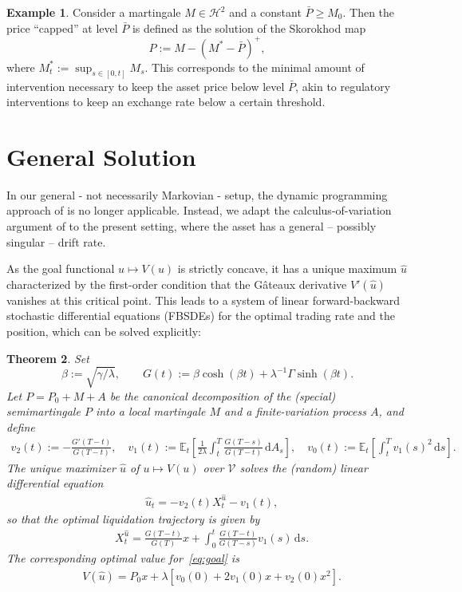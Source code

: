 \documentclass[11pt]{article}
\numberwithin{equation}{section}
\newtheorem{thm}{Theorem}[section]
\theoremstyle{definition}
\newtheorem{eg}[thm]{Example}
\theoremstyle{remark}
\newcommand{\E}{\mathbb{E}} %
\newcommand{\ts}{\textstyle}
\newcommand{\de}{\,\mathrm{d}}
\begin{document}
\begin{eg}\label{ex:target}
Consider a martingale $M\in\mathcal{H}^2$ and a constant $\bar{P} \geq M_0$. Then the price ``capped'' at level $\bar{P}$ is defined as the solution of the Skorokhod map 
$$P:=M-(M^*-\bar{P})^+,$$
where $M^*_t:=\sup_{s\in[0,t]} M_s$. This corresponds to the minimal amount of intervention necessary to keep the asset price below level $\bar{P}$, akin to regulatory interventions to keep an exchange rate below a certain threshold.
\end{eg}


\section{General Solution}\label{s:result}

In our general - not necessarily Markovian - setup, the dynamic programming approach of \cite{lehalle2017incorporating} is no longer applicable. Instead, we adapt the calculus-of-variation argument of \cite{bank2017hedging,bouchard2017equilibrium} to the present setting, where the asset has a general -- possibly singular -- drift rate. 

As the goal functional $u\mapsto V(u)$ is strictly concave, it has a unique maximum $\hat{u}$ characterized by the first-order condition that the G\^ateaux derivative $V'(\hat{u})$ vanishes at this critical point. This leads to a system of linear forward-backward stochastic differential equations (FBSDEs) for the optimal trading rate and the position, which can be solved explicitly:

\begin{thm}\label{main}
Set 
$$\beta:=\sqrt{\gamma/\lambda}, \qquad G(t):= \beta\cosh(\beta t)+\lambda^{-1}\Gamma\sinh(\beta t).
$$
Let $P=P_0+M+A$ be the canonical decomposition of the (special) semimartingale $P$ into a local martingale $M$ and a finite-variation process $A$, and define 
\begin{align*}
v_2(t):= 
-\frac{G'(T-t)}{G(T-t)}, \quad
v_1(t):= \E_t\left[ \frac{1}{2\lambda}\int_t^T \frac{G(T-s)}{G(T-t)} \de A_s \right], \quad
v_0(t):= \E_t\left[ \int_t^T v_1(s)^2 \de s \right].
\end{align*}
The unique maximizer $\hat{u}$ of $u\mapsto V(u)$ over $\mathcal V$ solves the (random) linear differential equation
\begin{align}\label{eq:ODE}
&\hat{u}_t = -v_2(t) X^{\hat{u}}_t - v_1(t),
\end{align}
so that the optimal liquidation trajectory is given by
\begin{align}\label{eq:Pos}
&X^{\hat{u}}_t = \frac{G(T-t)}{G(T)}x + \int_0^t \frac{G(T-t)}{G(T-s)} v_1(s) \de s.
\end{align}
The corresponding optimal value for~\eqref{eq:goal} is
\begin{align}\label{eq:vf}
&\ts V(\hat{u}) = P_0 x + \lambda\left[v_0(0) + 2 v_1(0) x + v_2(0) x^2\right].
\end{align}
\end{thm}
\end{document}
